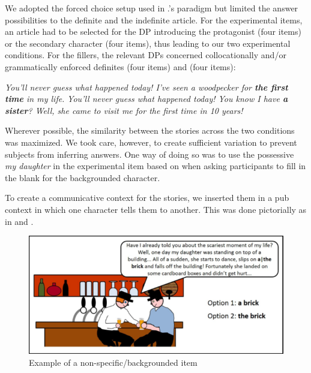 \documentclass[output=paper,
modfonts
]{langscibook}
\begin{document}
We adopted the forced choice setup used in \citeauthor{IoninKoWexler2004}.’s  paradigm but limited the answer possibilities to the definite and the indefinite article. For the experimental items, an article had to be selected for the DP introducing the protagonist (four items) or the secondary character (four items), thus leading to our two experimental conditions. For the fillers, the relevant DPs concerned collocationally and/or grammatically enforced definites (four items) and  (four items):

\ea\label{ex:lebruyn:4}
\textit{You’ll never guess what happened today! I’ve seen a woodpecker for \textbf{the first time} in my life.}
\z 
\ea\label{ex:lebruyn:5}
\textit{You’ll never guess what happened today! You know I have \textbf{a sister}? Well, she came to visit 	me for the first time in 10 years!}
\z 

Wherever possible, the similarity between the stories across the two conditions was maximized. We took care, however, to create sufficient variation to prevent subjects from inferring answers. One way of doing so was to use the possessive \textit{my daughter} in the experimental item based on  when asking participants to fill in the blank for the backgrounded character.

To create a communicative context for the stories, we inserted them in a pub context in which one character tells them to another. This was done pictorially as in  and .

\begin{figure}[h]
\includegraphics[height=.25\textheight]{figures/fig1.png}
\caption{Example of a non-specific/backgrounded item}
\label{fig:lebruyn:1}
\end{figure}
\end{document}
